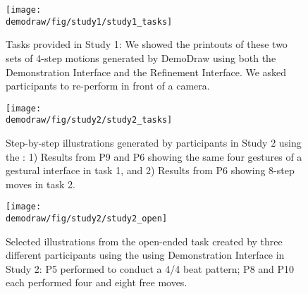 \begin{appendices}
\renewcommand\thefigure{D.\arabic{figure}}

\begin{figure}[h!]
     \centering
    \texttt{[image: \\demodraw/fig/study1/study1\_tasks]}
    \caption{Tasks provided in Study 1: We showed the printouts of these two sets of 4-step motions generated by DemoDraw using both the Demonstration Interface and the Refinement Interface. We asked participants to re-perform in front of a camera.}
    \label{fig:study_review_tasks}
 \end{figure}

   \vspace{6mm}
\begin{figure}[h!]
     \centering
    \texttt{[image: \\demodraw/fig/study2/study2\_tasks]}
    \caption{Step-by-step illustrations generated by participants in Study 2 using the \phaseI{}: 1) Results from P9 and P6 showing the same four gestures of a gestural interface in task 1, and 2) Results from P6 showing 8-step moves in task 2.}
    \label{fig:study_authoring_tasks}
   \end{figure}

   \vspace{6mm}
\begin{figure}[h!]
     \centering
    \texttt{[image: \\demodraw/fig/study2/study2\_open]}
    \caption{Selected illustrations from the open-ended task created by three different participants using the using Demonstration Interface in Study 2: P5 performed to conduct a 4/4 beat pattern; P8 and P10 each performed four and eight free moves.}
    \label{fig:open_ended_examples}
 \end{figure}

\end{appendices}
